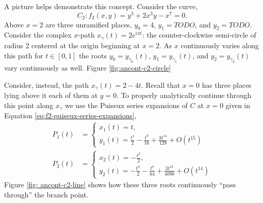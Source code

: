 \begin{example}
A picture helps demonstrate this concept. Consider the curve,
\[
  C_2 : f_2(x,y) = y^3 + 2x^3y - x^7 = 0.
\]
Above $x=2$ are three unramified places, $y_0 = 4$, $y_1 = TODO$, and $y_2 =
TODO$. Consider the complex $x$-path $x_\gamma(t) = 2e^{i \pi t}$: the
counter-clockwise semi-circle of radius 2 centered at the origin beginning at
$x=2$. As $x$ continuously varies along this path for $t \in [0,1]$ the roots
$y_0 = y_{\gamma_0}(t)$, $y_1 = y_{\gamma_1}(t)$, and $y_2 = y_{\gamma_2}(t)$
vary continuously as well. Figure \ref{fig:ancont-c2-circle}

Consider, instead, the path $x_{\gamma} (t) = 2 - 4t$. Recall that $x=0$ has
three places lying above it each of them at $y=0$. To properly analytically
continue through this point along $x_{\gamma}$ we use the Puiseux series
expansions of $C$ at $x=0$ given in Equation
\eqref{eq:f2-puiseux-series-expansions},
\begin{align*}
    P_1(t) &= \begin{cases}
        x_1(t) = t, \\
        y_1(t) = \frac{t^{4}}{2} - \frac{t^{9}}{16} + \frac{3 t^{14}}{128} + O\left(t^{15}\right)
      \end{cases} \\
    P_2(t) &= \begin{cases}
      x_2(t) = - \frac{t^{2}}{2}, \\
      y_2(t) =  - \frac{t^{3}}{2} - \frac{t^{8}}{64} + \frac{3 t^{13}}{4096} + O\left(t^{14}\right)
    \end{cases}
\end{align*}
Figure \ref{fig: ancont-c2-line} shows how these three roots continuously ``pass
through'' the branch point.
  

\end{example}
